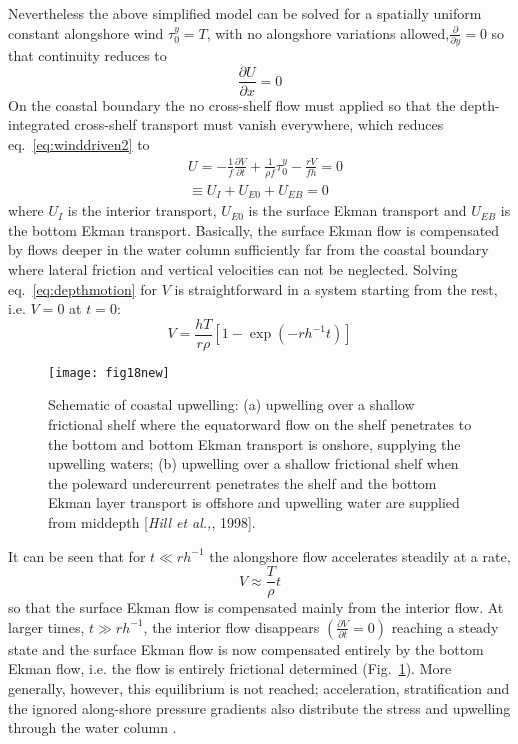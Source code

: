 Nevertheless the above simplified model can be solved for a
spatially uniform constant alongshore wind $\tau_0^y=T$, with no
alongshore variations allowed,$\frac{\partial}{\partial y}=0$ so
that continuity reduces to
\begin{equation}\label{eq:consimp}
 \frac{\partial U}{\partial x}=0
\end{equation}
On the coastal boundary the no cross-shelf flow must applied so
that the depth-integrated cross-shelf transport must vanish
everywhere, which reduces eq.~\ref{eq:winddriven2} to
\begin{eqnarray}\label{eq:depthmotion}
 &U=-\frac{1}{f}\frac{\partial V}{\partial t}+
 \frac{1}{\rho f}\tau_0^y-\frac{rV}{fh}=0  \\
 & \equiv U_I+U_{E0}+U_{EB}=0 \nonumber
\end{eqnarray}
where $U_I$ is the interior transport, $U_{E0}$ is the surface
Ekman transport and $U_{EB}$ is the bottom Ekman transport.
Basically, the surface Ekman flow is compensated by flows deeper
in the water column sufficiently far from the coastal boundary
where lateral friction and vertical velocities can not be
neglected. Solving eq.~\ref{eq:depthmotion} for $V$ is
straightforward in a system starting from the rest, i.e. $V=0$ at
$t=0$:
\begin{equation}\label{eq:depthsol1}
  V=\frac{hT}{r\rho}[1-\exp(-rh^{-1}t)]
\end{equation}
\begin{figure}
  \centering
  \texttt{[image: fig18new]}
  \caption{Schematic of coastal upwelling: (a) upwelling over a
  shallow frictional shelf where the equatorward flow on the shelf
  penetrates to the bottom and bottom Ekman transport is onshore,
  supplying the upwelling waters; (b) upwelling over a shallow
  frictional shelf when the poleward undercurrent penetrates the
  shelf and the bottom Ekman layer transport is offshore and
  upwelling water are supplied from middepth
  [{\it Hill et al.,}, 1998].}
  \label{fig:polewdiag}
\end{figure}

It can be seen that for $t \ll rh^{-1}$ the alongshore flow
accelerates steadily at a rate,
\begin{equation}\label{eq:depthsol2}
  V\approx \frac{T}{\rho}t
\end{equation}
so that the surface Ekman flow is compensated mainly from the
interior flow. At larger times, $t \gg rh^{-1}$, the interior flow
disappears $(\frac{\partial V}{\partial t}=0)$ reaching a steady
state and the surface Ekman flow is now compensated entirely by
the bottom Ekman flow, i.e. the flow is entirely frictional
determined (Fig.~\ref{fig:polewdiag}). More generally, however,
this equilibrium is not reached; acceleration, stratification and
the ignored along-shore pressure gradients also distribute the
stress and upwelling through the water column \citep{Huthnance95}.


